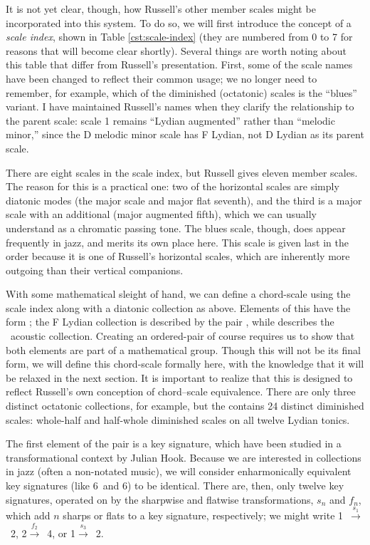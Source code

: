 It is not yet clear, though, how Russell's other member scales might be
incorporated into this system. To do so, we will first introduce the concept
of a \emph{scale index}, shown in Table \ref{cst:scale-index} (they are
numbered from 0 to 7 for reasons that will become clear shortly). Several
things are worth noting about this table that differ from Russell's
presentation. First, some of the scale names have been changed to reflect
their common usage; we no longer need to remember, for example, which of the
diminished (octatonic) scales is the ``blues'' variant. I have
maintained Russell's names when they clarify the relationship to the parent
scale: scale 1 remains ``Lydian augmented'' rather than ``melodic minor,''
since the D melodic minor scale has F Lydian, not D Lydian as its parent scale.

There are eight scales in the scale index, but Russell gives eleven member
scales. The reason for this is a practical one: two of the horizontal scales
are simply diatonic modes (the major scale and major flat seventh), and the
third is a major scale with an additional \sharp{} (major augmented
fifth), which we can usually understand as a chromatic passing tone. The blues
scale, though, does appear frequently in jazz, and merits its own place
here. This scale is given last in the order because it is one of
Russell's horizontal scales, which are inherently more outgoing than their
vertical companions.

With some mathematical sleight of hand, we can define a chord-scale \gis using
the scale index along with a diatonic collection as above. Elements of this
\gis have the form ;
the F Lydian collection is described by the pair ,
while  describes the \Eflat\ acoustic
collection. Creating an ordered-pair \gis of course requires us to show that
both elements are part of a mathematical group. Though this will not be its
final form, we will define this chord-scale \gis formally
here, with the knowledge that it will be relaxed in the next section. It is
important to realize that this \gis is designed to reflect Russell's own conception
of chord--scale equivalence. There are only three distinct octatonic
collections, for example, but the \gis contains 24 distinct diminished scales:
whole-half and half-whole diminished scales on all twelve Lydian tonics.

The first element of the pair is a key signature, which have been studied in a
transformational context by Julian Hook. Because we are interested
in collections in jazz (often a non-notated music), we will consider
enharmonically equivalent key signatures (like 6\sharp\ and 6\kern0.8pt\flat) to be
identical. There are, then, only twelve key signatures, operated on by the
sharpwise and flatwise transformations, $s_n$ and $f_n$, which add $n$ sharps
or flats to a key signature, respectively; we might write \mbox{1\sharp
$\xrightarrow{\ s_1\ }$ 2\sharp}, \mbox{2\flat $\xrightarrow{\ f_2\ }$ 4\flat}, or
\mbox{1\flat $\xrightarrow{\ s_3\ }$ 2\sharp}.

